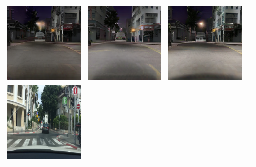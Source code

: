 \documentclass{VUMIFPSbakalaurinis}
\begin{document}
\begin{table}[H]
{\begin{tabular}{|c|c|c|c|}
            \includegraphics[scale=0.35]{img/pvz/4_cycle} & \includegraphics[scale=0.35]{img/pvz/4_cut} & \includegraphics[scale=0.35]{img/pvz/4_mspc}
            \\
            \hline
            \includegraphics[scale=0.35]{img/pvz/5_real} & 

\end{tabular}}
\end{table}
\end{document}
